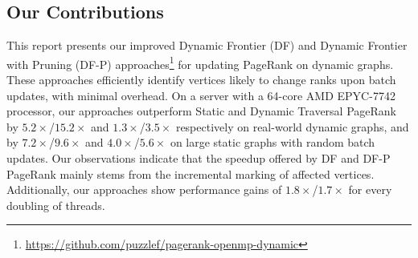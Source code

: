 \subsection{Our Contributions}

This report presents our improved Dynamic Frontier (DF) and Dynamic Frontier with Pruning (DF-P) approaches\footnote{\url{https://github.com/puzzlef/pagerank-openmp-dynamic}} for updating PageRank on dynamic graphs. These approaches efficiently identify vertices likely to change ranks upon batch updates, with minimal overhead. On a server with a 64-core AMD EPYC-7742 processor, our approaches outperform Static and Dynamic Traversal PageRank by $5.2\times$/$15.2\times$ and $1.3\times$/$3.5\times$ respectively on real-world dynamic graphs, and by $7.2\times$/$9.6\times$ and $4.0\times$/$5.6\times$ on large static graphs with random batch updates. Our observations indicate that the speedup offered by DF and DF-P PageRank mainly stems from the incremental marking of affected vertices. Additionally, our approaches show performance gains of $1.8\times$/$1.7\times$ for every doubling of threads.









